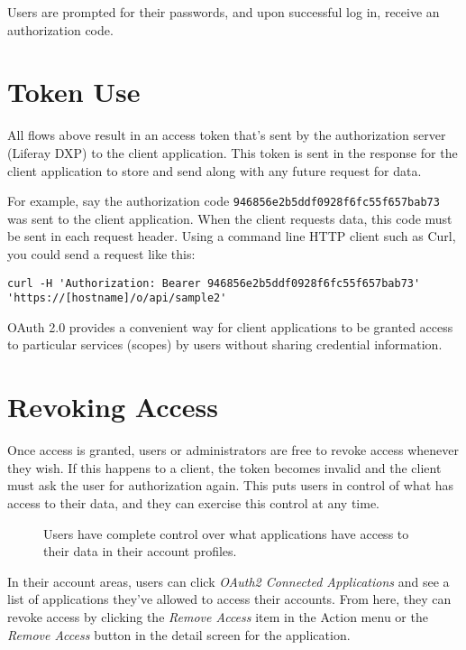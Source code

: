 Users are prompted for their passwords, and upon successful log in,
receive an authorization code.

\section{Token Use}\label{token-use}

All flows above result in an access token that's sent by the
authorization server (Liferay DXP) to the client application. This token
is sent in the response for the client application to store and send
along with any future request for data.

For example, say the authorization code
\texttt{946856e2b5ddf0928f6fc55f657bab73} was sent to the client
application. When the client requests data, this code must be sent in
each request header. Using a command line HTTP client such as Curl, you
could send a request like this:

\begin{verbatim}
curl -H 'Authorization: Bearer 946856e2b5ddf0928f6fc55f657bab73' 'https://[hostname]/o/api/sample2'
\end{verbatim}

OAuth 2.0 provides a convenient way for client applications to be
granted access to particular services (scopes) by users without sharing
credential information.

\section{Revoking Access}\label{revoking-access}

Once access is granted, users or administrators are free to revoke
access whenever they wish. If this happens to a client, the token
becomes invalid and the client must ask the user for authorization
again. This puts users in control of what has access to their data, and
they can exercise this control at any time.

\begin{figure}
\centering
{}
\caption{Users have complete control over what applications have access
to their data in their account profiles.}
\end{figure}

In their account areas, users can click \emph{OAuth2 Connected
Applications} and see a list of applications they've allowed to access
their accounts. From here, they can revoke access by clicking the
\emph{Remove Access} item in the Action menu or the \emph{Remove Access}
button in the detail screen for the application.

